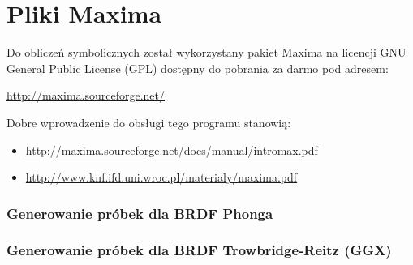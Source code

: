 \documentclass[../main.tex]{subfiles}
\begin{document}
\chapter{Pliki Maxima}
\label{appendix:maxima}

Do obliczeń symbolicznych został wykorzystany pakiet Maxima na licencji GNU
General Public License (GPL) dostępny do pobrania za darmo pod adresem:

\url{http://maxima.sourceforge.net/}

Dobre wprowadzenie do obsługi tego programu stanowią:

\begin{itemize}
\item \url{http://maxima.sourceforge.net/docs/manual/intromax.pdf}
\item \url{http://www.knf.ifd.uni.wroc.pl/materialy/maxima.pdf}
\end{itemize}

\subsection*{Generowanie próbek dla BRDF Phonga}


\subsection*{Generowanie próbek dla BRDF Trowbridge-Reitz (GGX)}

\end{document}

